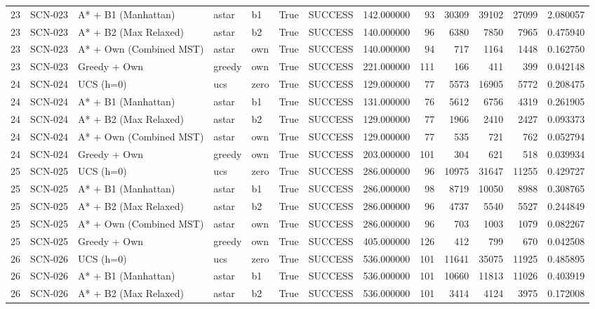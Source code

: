 \begin{table}[htbp]
\begin{tabular}{rllllrlrrrrrr}
23 & SCN-023 & A* + B1 (Manhattan) & astar & b1 & True & SUCCESS & 142.000000 & 93 & 30309 & 39102 & 27099 & 2.080057 \\
23 & SCN-023 & A* + B2 (Max Relaxed) & astar & b2 & True & SUCCESS & 140.000000 & 96 & 6380 & 7850 & 7965 & 0.475940 \\
23 & SCN-023 & A* + Own (Combined MST) & astar & own & True & SUCCESS & 140.000000 & 94 & 717 & 1164 & 1448 & 0.162750 \\
23 & SCN-023 & Greedy + Own & greedy & own & True & SUCCESS & 221.000000 & 111 & 166 & 411 & 399 & 0.042148 \\
24 & SCN-024 & UCS (h=0) & ucs & zero & True & SUCCESS & 129.000000 & 77 & 5573 & 16905 & 5772 & 0.208475 \\
24 & SCN-024 & A* + B1 (Manhattan) & astar & b1 & True & SUCCESS & 131.000000 & 76 & 5612 & 6756 & 4319 & 0.261905 \\
24 & SCN-024 & A* + B2 (Max Relaxed) & astar & b2 & True & SUCCESS & 129.000000 & 77 & 1966 & 2410 & 2427 & 0.093373 \\
24 & SCN-024 & A* + Own (Combined MST) & astar & own & True & SUCCESS & 129.000000 & 77 & 535 & 721 & 762 & 0.052794 \\
24 & SCN-024 & Greedy + Own & greedy & own & True & SUCCESS & 203.000000 & 101 & 304 & 621 & 518 & 0.039934 \\
25 & SCN-025 & UCS (h=0) & ucs & zero & True & SUCCESS & 286.000000 & 96 & 10975 & 31647 & 11255 & 0.429727 \\
25 & SCN-025 & A* + B1 (Manhattan) & astar & b1 & True & SUCCESS & 286.000000 & 98 & 8719 & 10050 & 8988 & 0.308765 \\
25 & SCN-025 & A* + B2 (Max Relaxed) & astar & b2 & True & SUCCESS & 286.000000 & 96 & 4737 & 5540 & 5527 & 0.244849 \\
25 & SCN-025 & A* + Own (Combined MST) & astar & own & True & SUCCESS & 286.000000 & 96 & 703 & 1003 & 1079 & 0.082267 \\
25 & SCN-025 & Greedy + Own & greedy & own & True & SUCCESS & 405.000000 & 126 & 412 & 799 & 670 & 0.042508 \\
26 & SCN-026 & UCS (h=0) & ucs & zero & True & SUCCESS & 536.000000 & 101 & 11641 & 35075 & 11925 & 0.485895 \\
26 & SCN-026 & A* + B1 (Manhattan) & astar & b1 & True & SUCCESS & 536.000000 & 101 & 10660 & 11813 & 11026 & 0.403919 \\
26 & SCN-026 & A* + B2 (Max Relaxed) & astar & b2 & True & SUCCESS & 536.000000 & 101 & 3414 & 4124 & 3975 & 0.172008 \\

\end{tabular}
\end{table}
